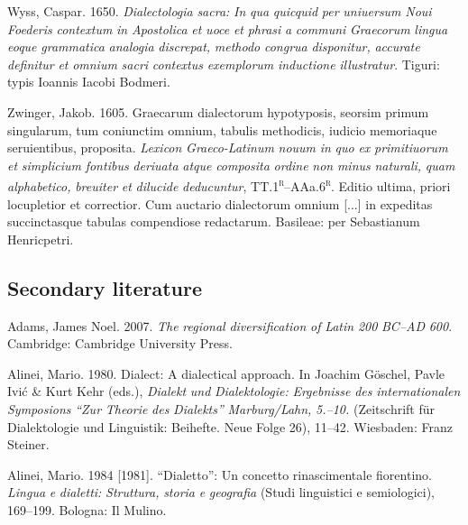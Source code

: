 Wyss, Caspar. 1650. \textit{Dialectologia} \textit{sacra:} \textit{In} \textit{qua} \textit{quicquid} \textit{per} \textit{uniuersum} \textit{Noui} \textit{Foederis} \textit{contextum} \textit{in} \textit{Apostolica} \textit{et} \textit{uoce} \textit{et} \textit{phrasi} \textit{a} \textit{communi} \textit{Graecorum} \textit{lingua} \textit{eoque} \textit{grammatica} \textit{analogia} \textit{discrepat,} \textit{methodo} \textit{congrua} \textit{disponitur,} \textit{accurate} \textit{definitur} \textit{et} \textit{omnium} \textit{sacri} \textit{contextus} \textit{exemplorum} \textit{inductione} \textit{illustratur}. Tiguri: typis Ioannis Iacobi Bodmeri.

Zwinger, Jakob. 1605. Graecarum dialectorum hypotyposis, seorsim primum singularum, tum coniunctim omnium, tabulis methodicis, iudicio memoriaque seruientibus, proposita. \textit{Lexicon} \textit{Graeco-Latinum} \textit{nouum} \textit{in} \textit{quo} \textit{ex} \textit{primitiuorum} \textit{et} \textit{simplicium} \textit{fontibus} \textit{deriuata} \textit{atque} \textit{composita} \textit{ordine} \textit{non} \textit{minus} \textit{naturali,} \textit{quam} \textit{alphabetico,} \textit{breuiter} \textit{et} \textit{dilucide} \textit{deducuntur}, TT.1\textsc{\textsuperscript{r}}–AAa.6\textsc{\textsuperscript{r}}. Editio ultima, priori locupletior et correctior. Cum auctario dialectorum omnium [...] in expeditas succinctasque tabulas compendiose redactarum. Basileae: per Sebastianum Henricpetri.

\subsection{Secondary literature}
\hypertarget{Toc19704872}{}
Adams, James Noel. 2007. \textit{The} \textit{regional} \textit{diversification} \textit{of} \textit{Latin} \textit{200} \textit{BC–AD} \textit{600}. Cambridge: Cambridge University Press.

Alinei, Mario. 1980. Dialect: A dialectical approach. In Joachim Göschel, Pavle Ivić \& Kurt Kehr (eds.), \textit{Dialekt} \textit{und} \textit{Dialektologie:} \textit{Ergebnisse} \textit{des} \textit{internationalen} \textit{Symposions} \textit{“Zur} \textit{Theorie} \textit{des} \textit{Dialekts”} \textit{Marburg/Lahn,} \textit{5.–10.} \textit{\citealt{September1977}} (Zeitschrift für Dialektologie und Linguistik: Beihefte. Neue Folge 26), 11–42. Wiesbaden: Franz Steiner.

Alinei, Mario. 1984 [1981]. “Dialetto”: Un concetto rinascimentale fiorentino. \textit{Lingua} \textit{e} \textit{dialetti:} \textit{Struttura,} \textit{storia} \textit{e} \textit{geografia} (Studi linguistici e semiologici), 169–199. Bologna: Il Mulino.


